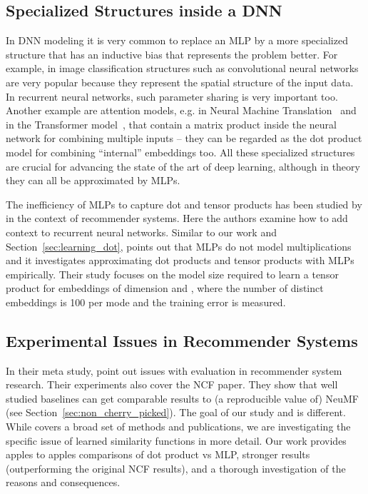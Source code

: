 \documentclass{article}
\begin{document}
\subsection{Specialized Structures inside a DNN}
\label{sec:related:dnn}

In DNN modeling it is very common to replace an MLP by a more specialized structure that has an inductive bias that represents the problem better.
For example, in image classification structures such as convolutional neural networks are very popular because they represent the spatial structure of the input data.
In recurrent neural networks, such parameter sharing is very important too.
Another example are attention models, e.g. in Neural Machine Translation~\cite{wu2016google} and in the Transformer model~\cite{vaswani2017attention}, that contain a matrix product inside the neural network for combining multiple inputs -- they can be regarded as the dot product model for combining ``internal'' embeddings too.
All these specialized structures are crucial for advancing the state of the art of deep learning, although in theory they can all be approximated by MLPs.

The inefficiency of MLPs to capture dot and tensor products has been studied by \cite{beutel:wsdm18} in the context of recommender systems.
Here the authors examine how to add context to recurrent neural networks.
Similar to our work and Section~\ref{sec:learning_dot}, \cite{beutel:wsdm18} points out that MLPs do not model multiplications and it investigates approximating dot products and tensor products with MLPs empirically.
Their study focuses on the model size required to learn a tensor product for embeddings of dimension  and , where the number of distinct embeddings is 100 per mode and the training error is measured.

\subsection{Experimental Issues in Recommender Systems}

In their meta study, \cite{dacrema:arxiv2019} point out issues with evaluation in recommender system research.
Their experiments also cover the NCF paper.
They show that well studied baselines can get comparable results to (a reproducible value of) NeuMF (see Section~\ref{sec:non_cherry_picked}).
The goal of our study and \cite{dacrema:arxiv2019} is different.
While \cite{dacrema:arxiv2019} covers a broad set of methods and publications, we are investigating the specific issue of learned similarity functions in more detail.
Our work provides apples to apples comparisons of dot product vs MLP, stronger results (outperforming the original NCF results), and a thorough investigation of the reasons and consequences.
\end{document}
